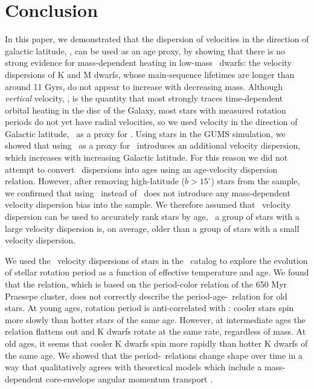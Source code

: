 \section{Conclusion}

In this paper, we demonstrated that the dispersion of velocities in the
direction of galactic latitude, \vb, can be used as an age proxy, by showing
that there is no strong evidence for mass-dependent heating in low-mass
\kepler\ dwarfs: the velocity dispersions of K and M dwarfs, whose
main-sequence lifetimes are longer than around 11 Gyrs, do not appear to
increase with decreasing mass.
Although {\it vertical} velocity, \vz, is the quantity that most strongly
traces time-dependent orbital heating in the disc of the Galaxy, most stars
with measured rotation periods do not yet have radial velocities, so we used
velocity in the direction of Galactic latitude, \vb\, as a proxy for \vz.
Using stars in the GUMS simulation, we showed that using \vb\ as a proxy for
\vz\ introduces an additional velocity dispersion, which increases with
increasing Galactic latitude.
For this reason we did not attempt to convert \vb\ dispersions into ages using
an age-velocity dispersion relation.
However, after removing high-latitude ($b>15^\circ$) stars from the sample, we
confirmed that using \vb\ instead of \vz\ does not introduce any
mass-dependent velocity dispersion bias into the sample.
We therefore assumed that \vb\ velocity dispersion can be used to accurately
rank stars by age, \ie\ a group of stars with a large velocity dispersion is,
on average, older than a group of stars with a small velocity dispersion.

We used the \vb\ velocity dispersions of stars in the \mct\ catalog to explore
the evolution of stellar rotation period as a function of effective
temperature and age.
We found that the \citet{angus2019} relation, which is based on the
period-color relation of the 650 Myr Praesepe cluster, does not correctly
describe the period-age-\teff\ relation for old stars.
At young ages, rotation period is anti-correlated with \teff: cooler stars
spin more slowly than hotter stars of the same age.
However, at intermediate ages the relation flattens out and K dwarfs rotate at
the same rate, regardless of mass.
At old ages, it seems that cooler K dwarfs spin more rapidly than hotter K
dwarfs of the same age.
We showed that the period-\teff\ relations change shape over time in a way
that qualitatively agrees with theoretical models which include a
mass-dependent core-envelope angular momentum transport \citep{spada2019}.

